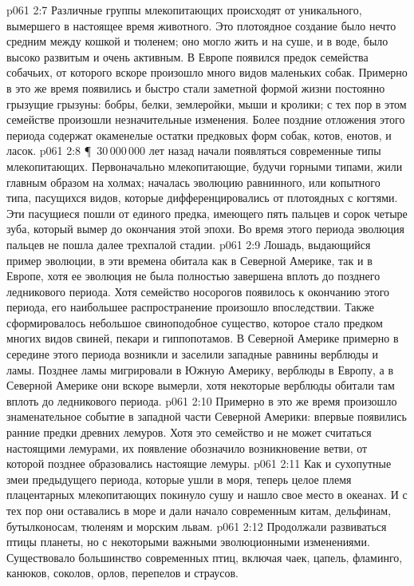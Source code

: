 \vs p061 2:7 Различные группы млекопитающих происходят от уникального, вымершего в настоящее время животного. Это плотоядное создание было нечто средним между кошкой и тюленем; оно могло жить и на суше, и в воде, было высоко развитым и очень активным. В Европе появился предок семейства собачьих, от которого вскоре произошло много видов маленьких собак. Примерно в это же время появились и быстро стали заметной формой жизни постоянно грызущие грызуны: бобры, белки, землеройки, мыши и кролики; с тех пор в этом семействе произошли незначительные изменения. Более поздние отложения этого периода содержат окаменелые остатки предковых форм собак, котов, енотов, и ласок.
\vs p061 2:8 \P\ 30\,000\,000 лет назад начали появляться современные типы млекопитающих. Первоначально млекопитающие, будучи горными типами, жили главным образом на холмах;  началась эволюцию равнинного, или копытного типа, пасущихся видов, которые дифференцировались от плотоядных с когтями. Эти пасущиеся пошли от единого предка, имеющего пять пальцев и сорок четыре зуба, который вымер до окончания этой эпохи. Во время этого периода эволюция пальцев не пошла далее трехпалой стадии.
\vs p061 2:9 Лошадь, выдающийся пример эволюции, в эти времена обитала как в Северной Америке, так и в Европе, хотя ее эволюция не была полностью завершена вплоть до позднего ледникового периода. Хотя семейство носорогов появилось к окончанию этого периода, его наибольшее распространение произошло впоследствии. Также сформировалось небольшое свиноподобное существо, которое стало предком многих видов свиней, пекари и гиппопотамов. В Северной Америке примерно в середине этого периода возникли и заселили западные равнины верблюды и ламы. Позднее ламы мигрировали в Южную Америку, верблюды в Европу, а в Северной Америке они вскоре вымерли, хотя некоторые верблюды обитали там вплоть до ледникового периода.
\vs p061 2:10 Примерно в это же время произошло знаменательное событие в западной части Северной Америки: впервые появились ранние предки древних лемуров. Хотя это семейство и не может считаться настоящими лемурами, их появление обозначило возникновение ветви, от которой позднее образовались настоящие лемуры.
\vs p061 2:11 Как и сухопутные змеи предыдущего периода, которые ушли в моря, теперь целое племя плацентарных млекопитающих покинуло сушу и нашло свое место в океанах. И с тех пор они оставались в море и дали начало современным китам, дельфинам, бутылконосам, тюленям и морским львам.
\vs p061 2:12 Продолжали развиваться птицы планеты, но с некоторыми важными эволюционными изменениями. Существовало большинство современных птиц, включая чаек, цапель, фламинго, канюков, соколов, орлов, перепелов и страусов.
